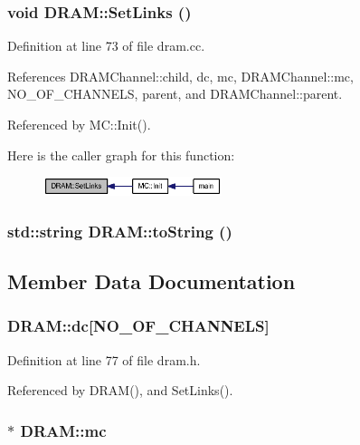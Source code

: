 \subsubsection[{SetLinks}]{\setlength{\rightskip}{0pt plus 5cm}void DRAM::SetLinks ()}\label{classDRAM_81ed024032a90e5cb7583aeffa1b2d72}




Definition at line 73 of file dram.cc.

References DRAMChannel::child, dc, mc, DRAMChannel::mc, NO\_\-OF\_\-CHANNELS, parent, and DRAMChannel::parent.

Referenced by MC::Init().

Here is the caller graph for this function:\nopagebreak
\begin{figure}[H]
\begin{center}
\leavevmode
\includegraphics[width=148pt]{classDRAM_81ed024032a90e5cb7583aeffa1b2d72_icgraph}
\end{center}
\end{figure}
\subsubsection[{toString}]{\setlength{\rightskip}{0pt plus 5cm}std::string DRAM::toString ()}\label{classDRAM_838b2e78677227b519959a20f12557f0}




\subsection{Member Data Documentation}
\subsubsection[{dc}]{ {\bf DRAM::dc}[{\bf NO\_\-OF\_\-CHANNELS}]}\label{classDRAM_7c519dc9331a72179a64d22c6cc206d1}




Definition at line 77 of file dram.h.

Referenced by DRAM(), and SetLinks().
\subsubsection[{mc}]{$\ast$ {\bf DRAM::mc}}\label{classDRAM_6544971f785eab4c76b48f675debe55e}




